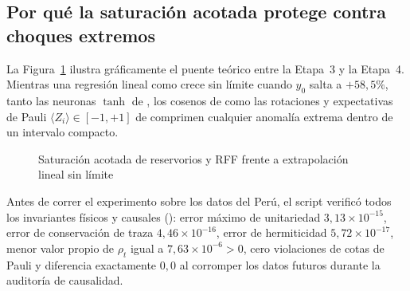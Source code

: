 \documentclass[12pt,letterpaper]{article}
\begin{document}
\subsection{Por qué la saturación acotada protege contra choques extremos}

La Figura~\ref{fig:compresion_acotada} ilustra gráficamente el puente teórico entre la Etapa~3 y la Etapa~4. Mientras una regresión lineal como  crece sin límite cuando \(y_0\) salta a \(+58{,}5\%\), tanto las neuronas \(\tanh\) de , los cosenos de  como las rotaciones y expectativas de Pauli \(\langle Z_i\rangle \in [-1, +1]\) de  comprimen cualquier anomalía extrema dentro de un intervalo compacto.

\begin{figure}[htbp]
  \caption{Saturación acotada de reservorios y RFF frente a extrapolación lineal sin límite}
  \label{fig:compresion_acotada}
  \centering
\end{figure}

Antes de correr el experimento sobre los datos del Perú, el script  verificó todos los invariantes físicos y causales (): error máximo de unitariedad \(3{,}13\times 10^{-15}\), error de conservación de traza \(4{,}46\times 10^{-16}\), error de hermiticidad \(5{,}72\times 10^{-17}\), menor valor propio de \(\rho_t\) igual a \(7{,}63\times 10^{-6} > 0\), cero violaciones de cotas de Pauli y diferencia exactamente \(0{,}0\) al corromper los datos futuros durante la auditoría de causalidad.
\end{document}
